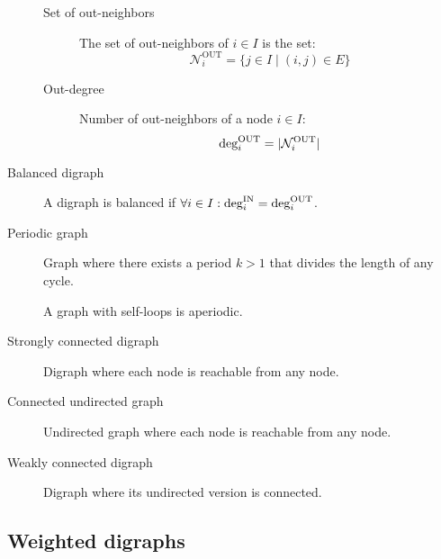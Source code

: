 \begin{description}
        \begin{description}
            \item[Set of out-neighbors] 
                The set of out-neighbors of $i \in I$ is the set:
                \[ \mathcal{N}_i^\text{OUT} = \{ j \in I \mid (i, j) \in E \} \] 

            \item[Out-degree] 
                Number of out-neighbors of a node $i \in I$:
                \[ \outdeg[i] = | \mathcal{N}_i^\text{OUT} | \] 
        \end{description}


    \item[Balanced digraph] 
        A digraph is balanced if $\forall i \in I: \indeg[i] = \outdeg[i]$.

    \item[Periodic graph] 
        Graph where there exists a period $k > 1$ that divides the length of any cycle.

        \begin{remark}
            A graph with self-loops is aperiodic.
        \end{remark}

    \item[Strongly connected digraph] 
        Digraph where each node is reachable from any node.

    \item[Connected undirected graph] 
        Undirected graph where each node is reachable from any node.    

    \item[Weakly connected digraph] 
        Digraph where its undirected version is connected.
\end{description}


\subsection{Weighted digraphs}

